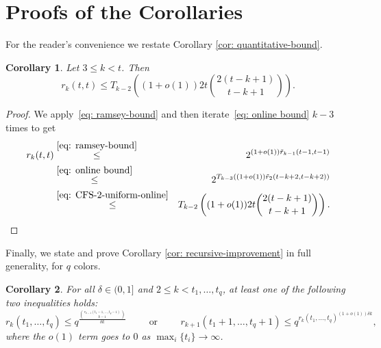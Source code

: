 \documentclass[A4paper,reqno,oneside,12pt]{amsart}
\theoremstyle{plain}
\newtheorem*{corollary*}{Corollary}
\theoremstyle{definition}
\def\d{\delta}
\begin{document}

\section{Proofs of the Corollaries}
\label{section: corollary proofs}
For the reader's convenience we restate Corollary \ref{cor: quantitative-bound}.

\begin{corollary*}
    Let $3 \leq k < t$. Then
    \begin{equation*}
        r_k(t,t)\leq T_{k-2}\left((1+o(1))2t\binom{2(t-k+1)}{t-k+1}\right).
    \end{equation*}
\end{corollary*}

\begin{proof}
     We apply~\eqref{eq: ramsey-bound} and then iterate~\eqref{eq: online bound} $k-3$ times to get
    \begin{eqnarray*}
        r_k(t,t) 
        &\stackrel{\eqref{eq: ramsey-bound}}{\leq}& 2^{(1+o(1))\tilde{r}_{k-1}(t-1,t-1)}\\
        &\stackrel{\eqref{eq: online bound}}{\leq}& 2^{T_{k-3}((1+o(1))\tilde{r}_2(t-k+2,t-k+2))}\\
        &\stackrel{\eqref{eq: CFS-2-uniform-online}}{\leq}& T_{k-2}\left((1+o(1))2t\binom{2(t-k+1)}{t-k+1}\right).
    \end{eqnarray*}
\end{proof}

Finally, we state and prove Corollary \ref{cor: recursive-improvement} in full generality, for $q$ colors.

\begin{corollary*}
\label{cor: recursive-improvement q-color}
    For all $\d \in (0,1]$ and $2 \leq k < t_1, \dots, t_q$, at least one of the following two inequalities holds:
    \begin{equation*}
        r_k(t_1, \dots, t_q) \leq q^{\frac{\binom{r_{k-1}(t_1-1,\ldots,t_q-1)}{k-1}}{\delta k}}
        \hspace{1cm}
        \text{or}
        \hspace{1cm}
        r_{k+1}(t_1+1, \dots, t_q+1) \leq q^{r_k(t_1, \dots, t_q)^{(1+o(1))\delta k}},
    \end{equation*}
    where the $o(1)$ term goes to $0$ as $\max_i\{t_i\}\to \infty$.
\end{corollary*}
\end{document}
